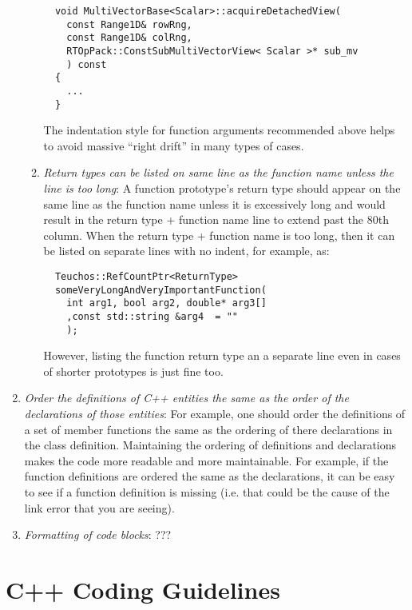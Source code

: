 \begin{enumerate}
\begin{enumerate}
  {\small\begin{verbatim}
  void MultiVectorBase<Scalar>::acquireDetachedView(
    const Range1D& rowRng,  
    const Range1D& colRng,  
    RTOpPack::ConstSubMultiVectorView< Scalar >* sub_mv
    ) const
  {
    ...
  }
  \end{verbatim}}
  
  The indentation style for function arguments recommended above helps to
  avoid massive ``right drift'' in many types of cases.

  {}\item\textit{Return types can be listed on same line as the function name
  unless the line is too long}: A function prototype's return type should
  appear on the same line as the function name unless it is excessively long
  and would result in the return type + function name line to extend past the
  80th column.  When the return type + function name is too long, then it can
  be listed on separate lines with no indent, for example, as:
  
  {\small\begin{verbatim}
  Teuchos::RefCountPtr<ReturnType>
  someVeryLongAndVeryImportantFunction(
    int arg1, bool arg2, double* arg3[]
    ,const std::string &arg4  = ""
    );
  \end{verbatim}}

  However, listing the function return type an a separate line even in cases
  of shorter prototypes is just fine too.

  \end{enumerate}

{}\item\textit{Order the definitions of C++ entities the same as the order of
the declarations of those entities}: For example, one should order the
definitions of a set of member functions the same as the ordering of there
declarations in the class definition.  Maintaining the ordering of definitions
and declarations makes the code more readable and more maintainable.  For
example, if the function definitions are ordered the same as the declarations,
it can be easy to see if a function definition is missing (i.e. that could be
the cause of the link error that you are seeing).

{}\item\textit{Formatting of code blocks}: ???

\end{enumerate}

%
\section{C++ Coding Guidelines}
\label{thyracodingguidelines:codingguidelines:sec}
%


